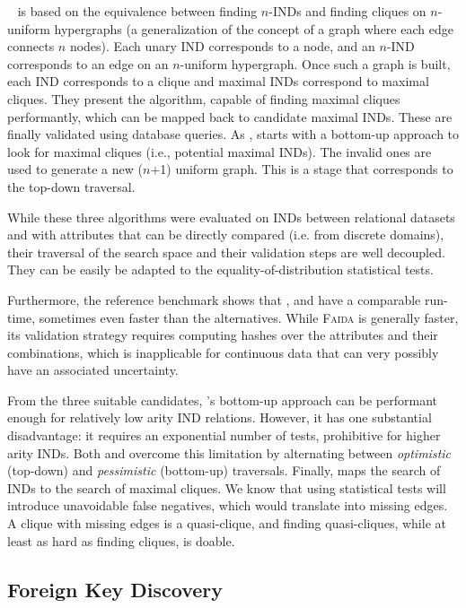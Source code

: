 \Find~\cite{koeller2003discovery} is based on the equivalence
between finding $n$-INDs and finding cliques on $n$-uniform hypergraphs (a generalization
of the concept of a graph where each edge connects $n$ nodes). Each unary \gls{IND} corresponds
to a node, and an $n$-IND corresponds to an edge on an $n$-uniform hypergraph.
Once such a graph is built, each \gls{IND} corresponds to a clique and maximal \glspl{IND}
correspond to maximal cliques. They present the \Hyperclique algorithm,
capable of finding maximal cliques performantly, which can be mapped back to candidate
maximal \glspl{IND}. These are finally validated using database queries.
As \Zigzag, \Find starts with a bottom-up
approach to look for maximal cliques (i.e., potential maximal \glspl{IND}). The invalid ones
are used to generate a new ($n$+1) uniform graph. This is a stage that corresponds to the top-down
traversal.

While these three algorithms were evaluated on \glspl{IND} between relational datasets
and with attributes that can be directly compared (i.e. from discrete domains), their
traversal of the search space and their validation steps are well decoupled. They
can be easily be adapted to the equality-of-distribution statistical tests.

Furthermore, the reference benchmark shows that \Mind, \Find
and \Zigzag have a comparable run-time, sometimes even
faster than the alternatives.
While \textsc{Faida} is generally faster, its
validation strategy requires computing hashes over the
attributes and their combinations, which is inapplicable
for continuous data that can very possibly have an associated uncertainty.

From the three suitable candidates, \Mind's bottom-up approach can be performant enough for
relatively low arity \gls{IND} relations. However, it has one substantial disadvantage:
it requires an exponential number of tests, prohibitive for higher arity \glspl{IND}.
Both \Zigzag and \Find overcome this limitation by alternating between \emph{optimistic}
(top-down) and \emph{pessimistic} (bottom-up) traversals.
Finally, \Find maps the search of \glspl{IND} to the search of maximal cliques. We know that
using statistical tests will introduce unavoidable false negatives, which would
translate into missing edges.
A clique with missing edges is a quasi-clique, and finding quasi-cliques, while at least
as hard as finding cliques, is doable.

\subsection{Foreign Key Discovery}

